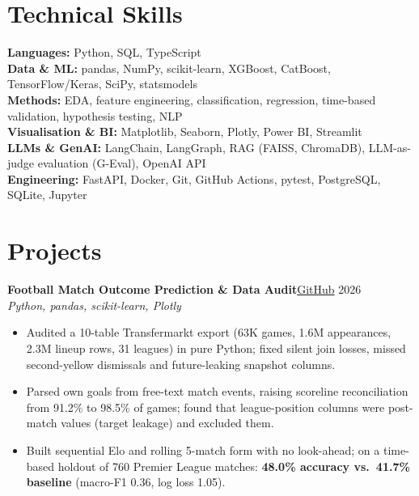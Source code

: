 \documentclass[10pt,a4paper]{article}
\newcommand{\project}[3]{%
  \par\addvspace{2.5pt}\textbf{#1}\hfill{\small #2}\\[-1pt]{\small\itshape #3}\par}
\begin{document}
\section{Technical Skills}
\textbf{Languages:} Python, SQL, TypeScript\\
\textbf{Data \& ML:} pandas, NumPy, scikit-learn, XGBoost, CatBoost, TensorFlow/Keras, SciPy, statsmodels\\
\textbf{Methods:} EDA, feature engineering, classification, regression, time-based validation,
hypothesis testing, NLP\\
\textbf{Visualisation \& BI:} Matplotlib, Seaborn, Plotly, Power BI, Streamlit\\
\textbf{LLMs \& GenAI:} LangChain, LangGraph, RAG (FAISS, ChromaDB), LLM-as-judge evaluation
(G-Eval), OpenAI API\\
\textbf{Engineering:} FastAPI, Docker, Git, GitHub Actions, pytest, PostgreSQL, SQLite, Jupyter

\section{Projects}

\project{Football Match Outcome Prediction \& Data Audit}
  {\href{https://github.com/Shah-123/football-match-outcome-prediction}{GitHub} \textbar{} 2026}
  {Python, pandas, scikit-learn, Plotly}
\begin{itemize}
  \item Audited a 10-table Transfermarkt export (63K games, 1.6M appearances, 2.3M lineup rows,
        31 leagues) in pure Python; fixed silent join losses, missed second-yellow dismissals
        and future-leaking snapshot columns.
  \item Parsed own goals from free-text match events, raising scoreline reconciliation from
        91.2\% to 98.5\% of games; found that league-position columns were post-match values
        (target leakage) and excluded them.
  \item Built sequential Elo and rolling 5-match form with no look-ahead; on a time-based holdout
        of 760 Premier League matches: \textbf{48.0\% accuracy vs.\ 41.7\% baseline} (macro-F1 0.36,
        log loss 1.05).
\end{itemize}
\end{document}
